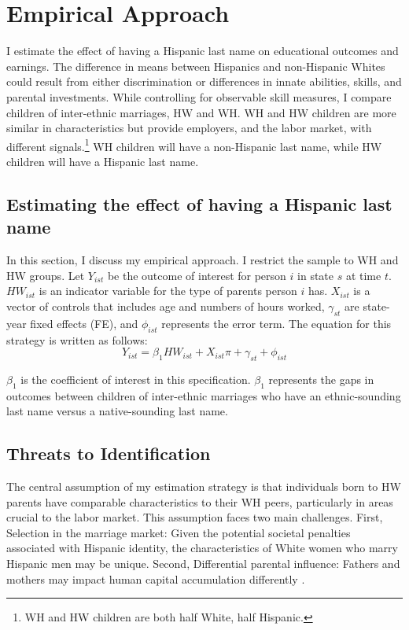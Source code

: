 \documentclass[a4paper,fleqn]{cas-sc}
\begin{document}
\section{Empirical Approach}\label{sec:emp_model}

I estimate the effect of having a Hispanic last name on educational outcomes and earnings. The difference in means between Hispanics and non-Hispanic Whites could result from either discrimination or differences in innate abilities, skills, and parental investments. While controlling for observable skill measures, I compare children of inter-ethnic marriages, HW and WH. WH and HW children are more similar in characteristics but provide employers, and the labor market, with different signals.\footnote{WH and HW children are both half White, half Hispanic.} WH children will have a non-Hispanic last name, while HW children will have a Hispanic last name. 

\subsection{Estimating the effect of having a Hispanic last name}

In this section, I discuss my empirical approach. I restrict the sample to WH and HW groups. Let $Y_{ist}$ be the outcome of interest for person $i$ in state $s$ at time $t$. $HW_{ist}$ is an indicator variable for the type of parents person $i$ has. $X_{ist}$ is a vector of controls that includes age and numbers of hours worked, $\gamma_{st}$ are state-year fixed effects (FE), and $\phi_{ist}$ represents the error term. The equation for this strategy is written as follows:
\begin{equation} \label{eq:1a}
Y_{ist} = \beta_{1} HW_{ist} + X_{ist} \pi + \gamma_{st} + \phi_{ist}
\end{equation}

$\beta_{1}$ is the coefficient of interest in this specification. $\beta_{1}$ represents the gaps in outcomes between children of inter-ethnic marriages who have an ethnic-sounding last name versus a native-sounding last name. 

\subsection{Threats to Identification}

The central assumption of my estimation strategy is that individuals born to HW parents have comparable characteristics to their WH peers, particularly in areas crucial to the labor market. This assumption faces two main challenges. First, Selection in the marriage market: Given the potential societal penalties associated with Hispanic identity, the characteristics of White women who marry Hispanic men may be unique. Second, Differential parental influence: Fathers and mothers may impact human capital accumulation differently \citep{kimball2009risk,magruder2010intergenerational}.
\end{document}
